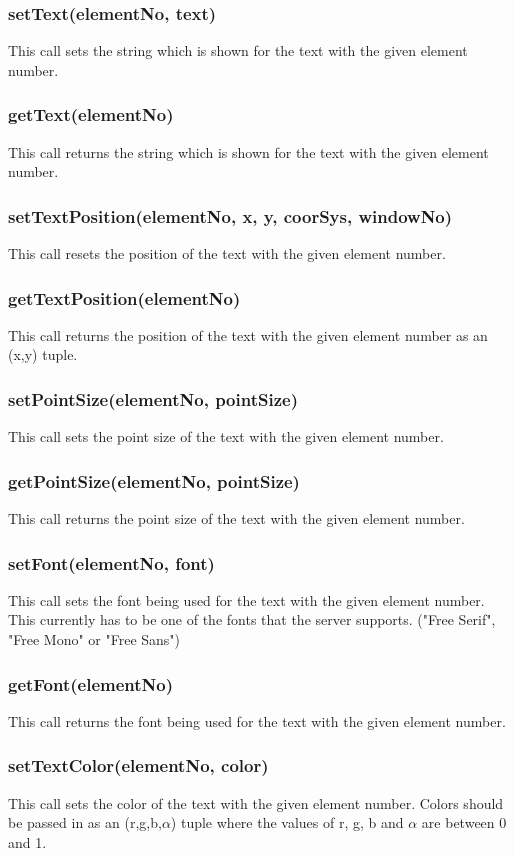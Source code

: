 \documentclass{acm_proc_article-sp}
\begin{document}
\subsubsection{setText(elementNo, text)}
This call sets the string which is shown for the text with the given element number.
\subsubsection{getText(elementNo)}
This call returns the string which is shown for the text with the given element number.
\subsubsection{setTextPosition(elementNo, x, y, coorSys, windowNo)}
This call resets the position of the text with the given element number.
\subsubsection{getTextPosition(elementNo)}
This call returns the position of the text with the given element number as an (x,y) tuple.
\subsubsection{setPointSize(elementNo, pointSize)}
This call sets the point size of the text with the given element number.
\subsubsection{getPointSize(elementNo, pointSize)}
This call returns the point size of the text with the given element number.
\subsubsection{setFont(elementNo, font)}
This call sets the font being used for the text with the given element number. This currently has to be one of the fonts that the server supports. ("Free Serif", "Free Mono" or "Free Sans")
\subsubsection{getFont(elementNo)}
This call returns the font being used for the text with the given element number.
\subsubsection{setTextColor(elementNo, color)}
This call sets the color of the text with the given element number. Colors should be passed in as an (r,g,b,$\alpha$) tuple where the values of r, g, b and $\alpha$ are between 0 and 1.
\end{document}
